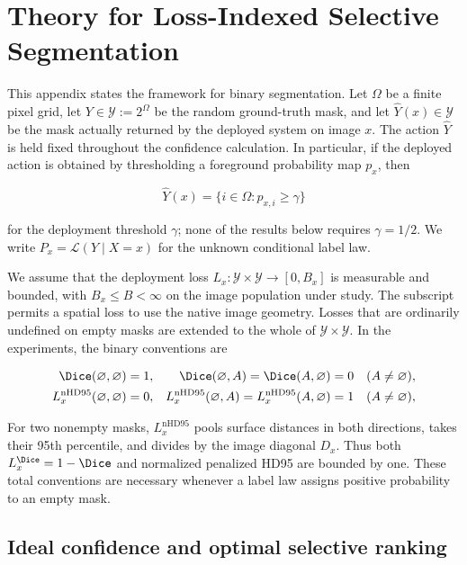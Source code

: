 \section{Theory for Loss-Indexed Selective Segmentation}
\label{app:theory}

This appendix states the framework for binary segmentation.  Let
$\Omega$ be a finite pixel grid, let $Y\in\mathcal{Y}:=2^\Omega$ be the
random ground-truth mask, and let $\widehat Y(x)\in\mathcal{Y}$ be the
mask actually returned by the deployed system on image $x$.  The action
$\widehat Y$ is held fixed throughout the confidence calculation.  In
particular, if the deployed action is obtained by thresholding a
foreground probability map $p_x$, then

\begin{equation}
  \widehat Y(x)=\{i\in\Omega:p_{x,i}\geq\gamma\}
\end{equation}

for the deployment threshold $\gamma$; none of the results below
requires $\gamma=1/2$.  We write $P_x=\mathcal{L}(Y\mid X=x)$ for the
unknown conditional label law.

We assume that the deployment loss $L_x:\mathcal{Y}\times
\mathcal{Y}\to[0,B_x]$ is measurable and bounded, with
$B_x\leq B<\infty$ on the image population under study.
The subscript permits a spatial loss to use the native image geometry.
Losses that are ordinarily undefined on empty masks are extended to the
whole of $\mathcal{Y}\times\mathcal{Y}$.  In the experiments, the binary
conventions are

\begin{align}
  \Dice(\varnothing,\varnothing)&=1,
  &\Dice(\varnothing,A)=\Dice(A,\varnothing)&=0
    &&(A\neq\varnothing),
  \label{app:eq:empty-dice}\\
  L_x^{\mathrm{nHD95}}(\varnothing,\varnothing)&=0,
  &L_x^{\mathrm{nHD95}}(\varnothing,A)
    =L_x^{\mathrm{nHD95}}(A,\varnothing)&=1
    &&(A\neq\varnothing),
  \label{app:eq:empty-boundary}
\end{align}

For two nonempty masks, $L_x^{\mathrm{nHD95}}$ pools surface distances in
both directions, takes their 95th percentile, and divides by the image
diagonal $D_x$. Thus both $L_x^{\Dice}=1-\Dice$ and normalized penalized
HD95 are bounded by one. These total conventions are necessary whenever a
label law assigns positive probability to an empty mask.

\subsection{Ideal confidence and optimal selective ranking}

